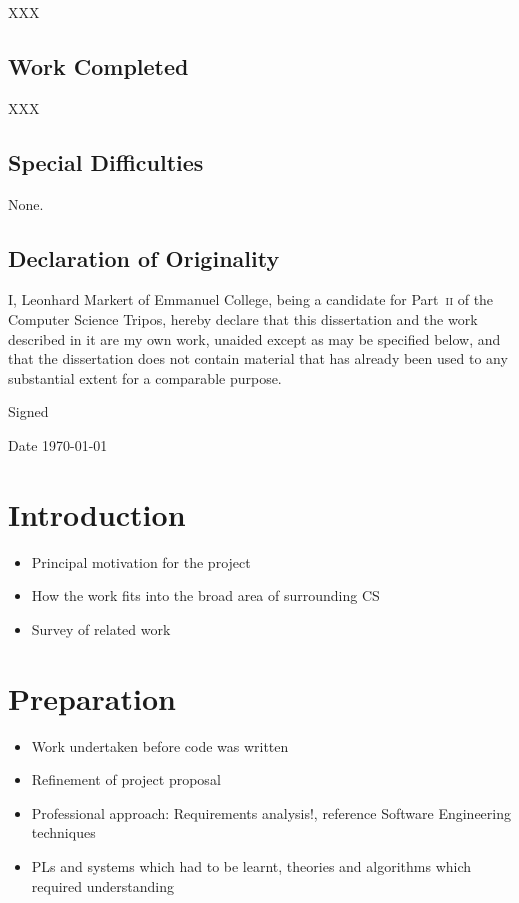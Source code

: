 \documentclass[11pt,chapterprefix=true,toc=bibliography,numbers=noendperiod]{scrreprt}
\begin{document}
XXX

\section*{Work Completed%
      \label{work-completed}%
}

XXX

\section*{Special Difficulties%
      \label{special-difficulties}%
}

None.

\section*{Declaration of Originality%
   \label{declaration-of-originality}%
}

I, Leonhard Markert of Emmanuel College, being a candidate for Part~\textsc{ii} of the Computer Science Tripos, hereby declare that this dissertation and the work described in it are my own work, unaided except as may be specified below, and that the dissertation does not contain material that has already been used to any substantial extent for a comparable purpose.

\vspace{0.3in}
Signed

\vspace{0.2in}
Date \hspace{0.4in} \today

\tableofcontents

\chapter{Introduction%
  \label{introduction}%
}

\begin{itemize}
    \item Principal motivation for the project
    \item How the work fits into the broad area of surrounding CS
    \item Survey of related work
\end{itemize}

\chapter{Preparation%
  \label{preparation}%
}

\begin{itemize}
    \item Work undertaken before code was written
    \item Refinement of project proposal
    \item Professional approach: Requirements analysis!, reference Software Engineering techniques
    \item PLs and systems which had to be learnt, theories and algorithms which required understanding
\end{itemize}
\end{document}
